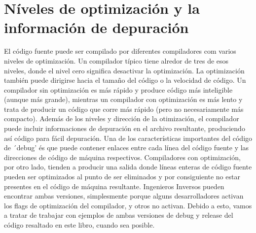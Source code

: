 \section*{Níveles de optimización y la información de depuración}
El código fuente puede ser compilado por diferentes compiladores com varios niveles de optimización.
Un compilador típico tiene alredor de tres de esos niveles, donde el nivel cero significa desactivar la optimización.
La optimización también puede dirigirse hacia el tamaño del código o la velocidad de código.
Un compilador sin optimización es más rápido y produce código más inteligible (aunque más grande), 
mientras un compilador con optimización es más lento y trata de producir un código que corre más rápido (pero no necesariamente más compacto).
Además de los niveles y dirección de la otimización, el compilador puede incluir informaciones de depuración en el archivo resultante, produciendo así código para fácil depuración.
Una de los características importantes del código de ´debug' és que puede contener enlaces entre
cada línea del código fuente y las direcciones de código de máquina respectivos.
Compiladores con optimización, por otro lado, tienden a producir una salida donde líneas enteras de código fuente pueden ser optimizados al punto de ser eliminados y por consiguiente no estar presentes en el código de máquina resultante.
Ingenieros Inversos pueden encontrar ambas versiones, simplesmente porque alguns desarrolladores activan los flags de optimización del compilador, y otros no activan. 
Debido a esto, vamos a tratar de trabajar con ejemplos de ambas versiones de debug y release del código resaltado en este libro, cuando sea posible.

